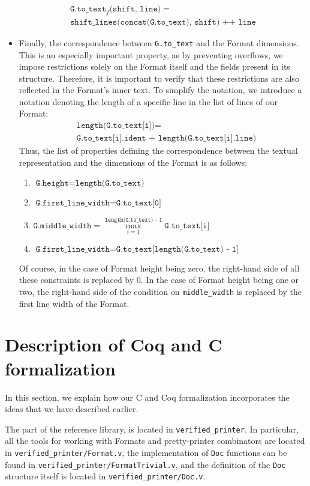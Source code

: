 \documentclass[14pt]{constructor-diploma}
\begin{document}
\begin{itemize}
  \begin{gather*}
      \texttt{G.to\_text}_f\texttt{(shift, line)} = \\
      \texttt{shift\_lines(concat(G.to\_text), shift) ++ line}
  \end{gather*}
  \item Finally, the correspondence between \texttt{G.to\_text} and the Format dimensions. 
  This is an especially important property, as by preventing overflows, we impose restrictions solely on the Format itself and the fields present in its structure. 
  Therefore, it is important to verify that these restrictions are also reflected in the Format's inner text. 
  To simplify the notation, we introduce a notation denoting the length of a specific line in the list of lines of our Format:
  \begin{align*}
    &\texttt{length(G.to\_text[i])} =\\ 
    &\texttt{G.to\_text[i].ident + length(G.to\_text[i].line)}
  \end{align*}
  Thus, the list of properties defining the correspondence between the textual representation and the dimensions of the Format is as follows:
  \begin{enumerate}
    \item $\texttt{G.height} = \texttt{length(G.to\_text)}$
    \item $\texttt{G.first\_line\_width} = \texttt{G.to\_text[0]}$
    \item $\texttt{G.middle\_width} = \max\limits_{i = 1}^{\texttt{length(G.to\_text) - 1}}\texttt{G.to\_text[i]}$
    \item $\texttt{G.first\_line\_width} = \texttt{G.to\_text[length(G.to\_text) - 1]}$
  \end{enumerate}

  Of course, in the case of Format height being zero, the right-hand side of all these constraints is replaced by 0. 
  In the case of Format height being one or two, the right-hand side of the condition on \texttt{middle\_width} is replaced by the first line width of the Format.
\end{itemize}

\section{Description of Coq and C formalization}
In this section, we explain how our C and Coq formalization incorporates the ideas that we have described earlier.

The part of the reference library, is located in \texttt{verified\_printer}. 
In particular, all the tools for working with Formats and pretty-printer combinators are located in \texttt{verified\_printer/Format.v}, 
the implementation of \texttt{Doc} functions can be found in \texttt{verified\_printer/FormatTrivial.v}, 
and the definition of the \texttt{Doc} structure itself is located in \texttt{verified\_printer/Doc.v}.
\end{document}
